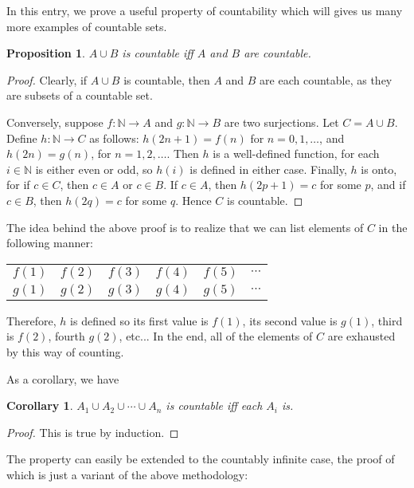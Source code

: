 \documentclass[12pt]{article}
\newtheorem{prop}{Proposition}
\newtheorem{cor}{Corollary}
\begin{document}
In this entry, we prove a useful property of countability which will gives us many more examples of countable sets.

\begin{prop}  $A\cup B$ is countable iff $A$ and $B$ are countable. \end{prop}
\begin{proof}  Clearly, if $A\cup B$ is countable, then $A$ and $B$ are each countable, as they are subsets of a countable set.

Conversely, suppose $f: \mathbb{N}\to A$ and $g:\mathbb{N}\to B$ are two surjections.  Let $C=A\cup B$.  Define $h:\mathbb{N} \to C$ as follows: $h(2n+1)=f(n)$ for $n=0,1,\ldots$, and $h(2n)=g(n)$, for $n=1,2,\ldots$.  Then $h$ is a well-defined function, for each $i\in \mathbb{N}$ is either even or odd, so $h(i)$ is defined in either case.  Finally, $h$ is onto, for if $c\in C$, then $c\in A$ or $c\in B$.  If $c\in A$, then $h(2p+1)=c$ for some $p$, and if $c\in B$, then $h(2q)=c$ for some $q$.  Hence $C$ is countable.
\end{proof}
The idea behind the above proof is to realize that we can list elements of $C$ in the following manner:
\begin{center}
\begin{tabular}{ c c c c c c }
	$f(1)$ & $f(2)$ & $f(3)$ & $f(4)$ & $f(5)$ & $\cdots$ \\
	$g(1)$ & $g(2)$ & $g(3)$ & $g(4)$ & $g(5)$ & $\cdots$ 
\end{tabular}
\end{center}
Therefore, $h$ is defined so its first value is $f(1)$, its second value is $g(1)$, third is $f(2)$, fourth $g(2)$, etc... In the end, all of the elements of $C$ are exhausted by this way of counting.

As a corollary, we have 

\begin{cor} $A_1 \cup A_2 \cup \cdots \cup A_n$ is countable iff each $A_i$ is. \end{cor}
\begin{proof} This is true by induction. \end{proof}

The property can easily be extended to the countably infinite case, the proof of which is just a variant of the above methodology:
\end{document}

